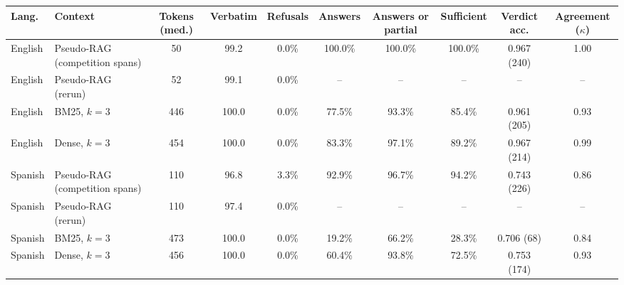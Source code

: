 \begin{tabular}{llcccccccc}
\hline
\textbf{Lang.} & \textbf{Context} & \textbf{Tokens (med.)} & \textbf{Verbatim} & \textbf{Refusals} & \textbf{Answers} & \textbf{Answers or partial} & \textbf{Sufficient} & \textbf{Verdict acc.} & \textbf{Agreement} ($\kappa$) \\
\hline
English & Pseudo-RAG (competition spans) & 50 & 99.2 & 0.0\% & 100.0\% & 100.0\% & 100.0\% & 0.967 (240) & 1.00 \\
English & Pseudo-RAG (rerun) & 52 & 99.1 & 0.0\% & -- & -- & -- & -- & -- \\
English & BM25, $k=3$ & 446 & 100.0 & 0.0\% & 77.5\% & 93.3\% & 85.4\% & 0.961 (205) & 0.93 \\
English & Dense, $k=3$ & 454 & 100.0 & 0.0\% & 83.3\% & 97.1\% & 89.2\% & 0.967 (214) & 0.99 \\
Spanish & Pseudo-RAG (competition spans) & 110 & 96.8 & 3.3\% & 92.9\% & 96.7\% & 94.2\% & 0.743 (226) & 0.86 \\
Spanish & Pseudo-RAG (rerun) & 110 & 97.4 & 0.0\% & -- & -- & -- & -- & -- \\
Spanish & BM25, $k=3$ & 473 & 100.0 & 0.0\% & 19.2\% & 66.2\% & 28.3\% & 0.706 (68) & 0.84 \\
Spanish & Dense, $k=3$ & 456 & 100.0 & 0.0\% & 60.4\% & 93.8\% & 72.5\% & 0.753 (174) & 0.93 \\
\hline
\end{tabular}
